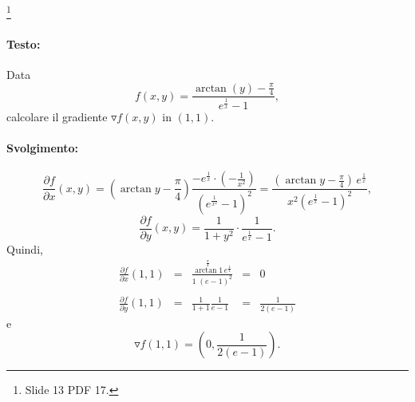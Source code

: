 \begin{example}
	\footnote{Slide 13 PDF 17.}
	\paragraph{Testo:} Data
	\begin{equation*}
		f(x,y) = \frac{\arctan(y)-\frac{\pi}{4}}{e^{\frac{1}{x}} - 1},
	\end{equation*}
	calcolare il gradiente $\triangledown f(x,y)$ in $(1,1)$.
	\paragraph{Svolgimento:}
	\begin{equation*}
		\frac{\partial f}{\partial x}(x,y) = \left(\arctan y - \frac{\pi}{4}\right)\frac{-e^{\frac{1}{x}} \cdot (-\frac{1}{x^2})}{(e^{\frac{1}{x^2}} - 1)^2} =  \frac{\left(\arctan y - \frac{\pi}{4}\right)\, e^{\frac{1}{x}}}{x^2(e^{\frac{1}{x}}-1)^2},
	\end{equation*}
	\begin{equation*}
		\frac{\partial f}{\partial y}(x,y) = \frac{1}{1 + y^2} \cdot \frac{1}{e^{\frac{1}{x}} - 1}.
	\end{equation*}
	Quindi,
	\begin{equation*}
		\begin{matrix}
			\frac{\partial f}{\partial x}(1, 1) &=& \frac{\overset{\frac{\pi}{4}}{\arctan 1} \, e^{\frac{1}{1}}}{1\;(e-1)^2} &=& 0\\\\
			\frac{\partial f}{\partial y}(1, 1) &=& \frac{1}{1+1} \frac{1}{e-1} &=& \frac{1}{2(e-1)} 
		\end{matrix}
	\end{equation*}
	e
	\begin{equation*}
		\triangledown f(1,1) = \left(0, \frac{1}{2(e-1)} \right).
	\end{equation*}
\end{example}
